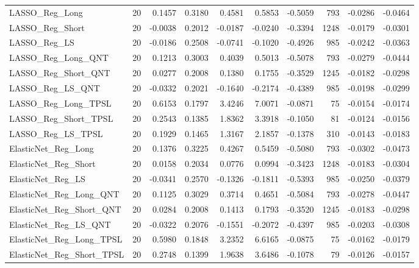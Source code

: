 \begin{tabular}{llrrrrrrrr}
\cline{1-10}
LASSO\_Reg\_Long & 20 & 0.1457 & 0.3180 & 0.4581 & 0.5853 & -0.5059 & 793 & -0.0286 & -0.0464 \\
\cline{1-10}
LASSO\_Reg\_Short & 20 & -0.0038 & 0.2012 & -0.0187 & -0.0240 & -0.3394 & 1248 & -0.0179 & -0.0301 \\
\cline{1-10}
LASSO\_Reg\_LS & 20 & -0.0186 & 0.2508 & -0.0741 & -0.1020 & -0.4926 & 985 & -0.0242 & -0.0363 \\
\cline{1-10}
LASSO\_Reg\_Long\_QNT & 20 & 0.1213 & 0.3003 & 0.4039 & 0.5013 & -0.5078 & 793 & -0.0279 & -0.0444 \\
\cline{1-10}
LASSO\_Reg\_Short\_QNT & 20 & 0.0277 & 0.2008 & 0.1380 & 0.1755 & -0.3529 & 1245 & -0.0182 & -0.0298 \\
\cline{1-10}
LASSO\_Reg\_LS\_QNT & 20 & -0.0332 & 0.2021 & -0.1640 & -0.2174 & -0.4389 & 985 & -0.0198 & -0.0299 \\
\cline{1-10}
LASSO\_Reg\_Long\_TPSL & 20 & 0.6153 & 0.1797 & 3.4246 & 7.0071 & -0.0871 & 75 & -0.0154 & -0.0174 \\
\cline{1-10}
LASSO\_Reg\_Short\_TPSL & 20 & 0.2543 & 0.1385 & 1.8362 & 3.3918 & -0.1050 & 81 & -0.0124 & -0.0156 \\
\cline{1-10}
LASSO\_Reg\_LS\_TPSL & 20 & 0.1929 & 0.1465 & 1.3167 & 2.1857 & -0.1378 & 310 & -0.0143 & -0.0183 \\
\cline{1-10}
ElasticNet\_Reg\_Long & 20 & 0.1376 & 0.3225 & 0.4267 & 0.5459 & -0.5080 & 793 & -0.0302 & -0.0473 \\
\cline{1-10}
ElasticNet\_Reg\_Short & 20 & 0.0158 & 0.2034 & 0.0776 & 0.0994 & -0.3423 & 1248 & -0.0183 & -0.0304 \\
\cline{1-10}
ElasticNet\_Reg\_LS & 20 & -0.0341 & 0.2570 & -0.1326 & -0.1811 & -0.5393 & 985 & -0.0250 & -0.0379 \\
\cline{1-10}
ElasticNet\_Reg\_Long\_QNT & 20 & 0.1125 & 0.3029 & 0.3714 & 0.4651 & -0.5084 & 793 & -0.0278 & -0.0447 \\
\cline{1-10}
ElasticNet\_Reg\_Short\_QNT & 20 & 0.0284 & 0.2008 & 0.1413 & 0.1793 & -0.3520 & 1245 & -0.0183 & -0.0298 \\
\cline{1-10}
ElasticNet\_Reg\_LS\_QNT & 20 & -0.0322 & 0.2076 & -0.1551 & -0.2072 & -0.4397 & 985 & -0.0203 & -0.0308 \\
\cline{1-10}
ElasticNet\_Reg\_Long\_TPSL & 20 & 0.5980 & 0.1848 & 3.2352 & 6.6165 & -0.0875 & 75 & -0.0162 & -0.0179 \\
\cline{1-10}
ElasticNet\_Reg\_Short\_TPSL & 20 & 0.2748 & 0.1399 & 1.9638 & 3.6486 & -0.1078 & 79 & -0.0126 & -0.0157 \\

\end{tabular}

